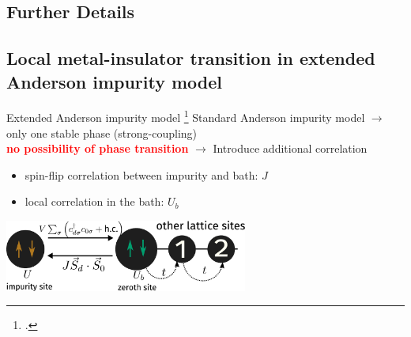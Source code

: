 \documentclass[11pt,aspectratio=169]{beamer}
\newcommand{\focus}[1]{\textcolor{red}{\bf{#1}}}
\begin{document}
\begin{frame}{}
\section{Further Details}
\end{frame}

\begin{frame}{}
\section{Local metal-insulator transition in extended Anderson impurity model}
\end{frame}

\begin{frame}{Extended Anderson impurity model}
\footcite{anderson_1961,hrk_wilson_1980,hewson1993}
Standard Anderson impurity model \(\longrightarrow\) only one stable phase (strong-coupling) \\[10pt]
\focus{no possibility of phase transition} \(\longrightarrow\) Introduce additional correlation\\[20pt]
\begin{itemize}
	\item spin-flip correlation between impurity and bath: \(J\)
	\item local correlation in the bath: \(U_b\)
\end{itemize}

\vspace*{\fill}

\includegraphics[width=0.6\textwidth]{zeromode_bare.pdf}

\end{frame}
\end{document}
